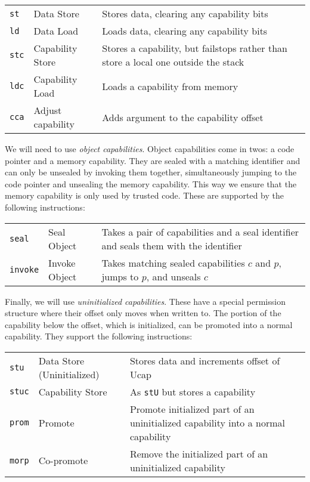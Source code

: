 \documentclass{article}
\begin{document}
\begin{tabular}{l l l}
  {\tt st}      & Data Store        & Stores data, clearing any capability bits \\
  {\tt ld}      & Data Load         & Loads data, clearing any capability bits \\
  {\tt stc}     & Capability Store  & Stores a capability, but failstops rather than store
                                      a local one outside the stack \\
  {\tt ldc}     & Capability Load   & Loads a capability from memory \\
  {\tt cca}     & Adjust capability & Adds argument to the capability offset \\ 
\end{tabular}

We will need to use {\em object capabilities}. Object capabilities come in twos:
a code pointer and a memory capability. They are sealed with a matching identifier and
can only be unsealed by invoking them together, simultaneously jumping to the code pointer
and unsealing the memory capability. This way we ensure that the memory capability is
only used by trusted code. These are supported by the following instructions:

\begin{tabular}{l l l}
  {\tt seal}   & Seal Object    & Takes a pair of capabilities and a seal identifier and
                                  seals them with the identifier \\
  {\tt invoke} & Invoke Object  & Takes matching sealed capabilities \(c\) and
                                  \(p\), jumps to \(p\), and unseals \(c\) \\
\end{tabular}

Finally, we will use {\em uninitialized capabilities}. These have a special permission structure
where their offset only moves when written to. The portion of the capability below the offset,
which is initialized, can be promoted into a normal capability. They support the following
instructions:

\begin{tabular}{l l l}
  {\tt stu}  & Data Store (Uninitialized) & Stores data and increments offset of Ucap \\
  {\tt stuc} & Capability Store           & As {\tt stU} but stores a capability \\
  {\tt prom} & Promote                    & Promote initialized part of an uninitialized capability
                                            into a normal capability \\
  {\tt morp} & Co-promote                 & Remove the initialized part of an uninitialized capability \\
\end{tabular}
\end{document}
